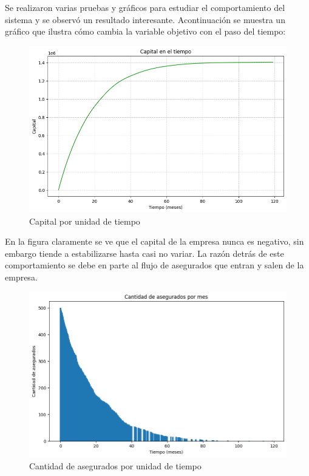 \documentclass[spanish]{article}
\begin{document}
Se realizaron varias pruebas y gr\'aficos para estudiar el comportamiento del sistema y se observ\'o un resultado interesante.
Acontinuaci\'on se muestra un gr\'afico que ilustra c\'omo cambia la variable objetivo con el paso del tiempo:
\begin{figure}[H]
    \centering
    \includegraphics[scale=0.5]{capital_tiempo.png}
    \caption{Capital por unidad de tiempo}
    \label{fig:Capital por unidad de tiempo}
\end{figure}
En la figura claramente se ve que el capital de la empresa nunca es negativo, sin embargo tiende a estabilizarse hasta casi no variar.
La raz\'on detr\'as de este comportamiento se debe en parte al flujo de asegurados que entran y salen de la empresa.
\begin{figure}[H]
    \centering
    \includegraphics[scale=0.5]{cant_asegurados.png}
    \caption{Cantidad de asegurados por unidad de tiempo}
    \label{fig:Cantidad de asegurados por unidad de tiempo}
\end{figure}
\end{document}
